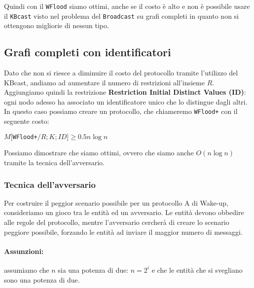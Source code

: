Quindi con il \texttt{WFlood} siamo ottimi, anche se il costo è alto e non è
possibile usare il \texttt{KBcast} visto nel problema del \texttt{Broadcast} su
grafi completi in quanto non si ottengono migliorie di nessun tipo.

\subsection{Grafi completi con identificatori}
Dato che non si riesce a diminuire il costo del protocollo tramite l'utilizzo
del KBcast, andiamo ad aumentare il numero di restrizioni all'insieme $R$.
Aggiungiamo quindi la restrizione \textbf{Restriction Initial Distinct Values
    (ID)}: ogni nodo adesso ha associato un identificatore unico che lo distingue
dagli altri. In questo caso possiamo creare un protocollo, che chiameremo
\texttt{WFlood+} con il seguente costo:

\begin{theorem}
    $M[$\texttt{WFlood+}$/R;K;ID] \geq 0.5n \log n$
\end{theorem}

Possiamo dimostrare che siamo ottimi, ovvero che siamo anche $O(n \log n)$
tramite la tecnica dell'avversario.

\subsubsection{Tecnica dell'avversario}
Per costruire il peggior scenario possibile per un protocollo A di Wake-up,
consideriamo un gioco tra le entità ed un avversario. Le entità devono obbedire
alle regole del protocollo, mentre l'avversario cercherà di creare lo scenario
peggiore possibile, forzando le entità ad inviare il maggior numero di messaggi.

\paragraph{Assunzioni:} assumiamo che $n$ sia una potenza di due: $n = 2^i$ e che
le entità che si svegliano sono una potenza di due.

